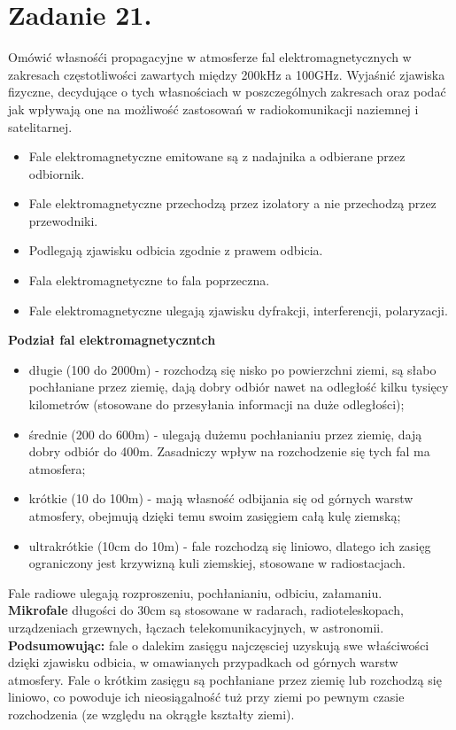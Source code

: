 \section*{Zadanie 21.}
\begin{task}
Omówić własnośći propagacyjne w atmosferze fal elektromagnetycznych w zakresach częstotliwości zawartych między 200kHz a 100GHz. Wyjaśnić zjawiska fizyczne, decydujące o tych własnościach w poszczególnych zakresach oraz podać jak wpływają one na możliwość zastosowań w radiokomunikacji naziemnej i satelitarnej.\\
\end{task}

\begin{solution}
\begin{itemize}
\item Fale elektromagnetyczne emitowane są z nadajnika a odbierane przez odbiornik.
\item Fale elektromagnetyczne przechodzą przez izolatory a nie przechodzą przez przewodniki.
\item Podlegają zjawisku odbicia zgodnie z prawem odbicia.
\item Fala elektromagnetyczne to fala poprzeczna.
\item Fale elektromagnetyczne ulegają zjawisku dyfrakcji, interferencji, polaryzacji.\\
\end{itemize}

\textbf{Podział fal elektromagnetyczntch}
\begin{itemize}
\item długie (100 do 2000m) - rozchodzą się nisko po powierzchni ziemi, są słabo pochłaniane przez ziemię, dają dobry odbiór nawet na odległość kilku tysięcy kilometrów (stosowane do przesyłania informacji na duże odległości);
\item średnie (200 do 600m) - ulegają dużemu pochłanianiu przez ziemię, dają dobry odbiór do 400m. Zasadniczy wpływ na rozchodzenie się tych fal ma atmosfera;
\item krótkie (10 do 100m) - mają własność odbijania się od górnych warstw atmosfery, obejmują dzięki temu swoim zasięgiem całą kulę ziemską;
\item ultrakrótkie (10cm do 10m) - fale rozchodzą się liniowo, dlatego ich zasięg ograniczony jest krzywizną kuli ziemskiej, stosowane w radiostacjach.
\end{itemize}
Fale radiowe ulegają rozproszeniu, pochłanianiu, odbiciu, załamaniu.\\

\textbf{Mikrofale} długości do 30cm są stosowane w radarach, radioteleskopach, urządzeniach grzewnych, łączach telekomunikacyjnych, w astronomii.\\

\textbf{Podsumowując:} fale o dalekim zasięgu najczęsciej uzyskują swe właściwości dzięki zjawisku odbicia, w omawianych przypadkach od górnych warstw atmosfery. Fale o krótkim zasięgu są pochłaniane przez ziemię lub rozchodzą się liniowo, co powoduje ich nieosiągalność tuż przy ziemi po pewnym czasie rozchodzenia (ze względu na okrągłe kształty ziemi).

\end{solution}